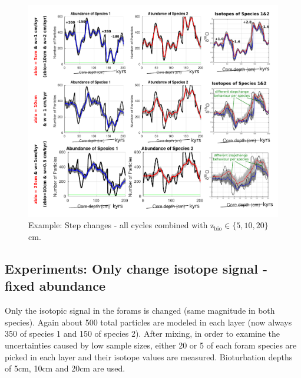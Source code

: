 \documentclass[a4paper,oneside,9pt]{article}
\begin{document}
\begin{figure}[hbp]
\begin{center}
	\includegraphics[width=1.0\textwidth]{../figures/../figures/Allcycles_combined_stepevent_bigger_5+10+20cm_background.pdf}
	\caption{Example: Step changes - all cycles combined with z$_\mathrm{bio} \in \{5,10,20 \}$cm.}\label{fig:5pointevent}
\end{center}
\end{figure}



\subsection{Experiments: Only change isotope signal - fixed abundance}
Only the isotopic signal in the forams is changed (same magnitude in both species). Again about 500 total particles are modeled in each layer (now always 350 of species 1 and 150 of species 2). 
After mixing, in order to examine the uncertainties caused by low sample sizes, either 20 or 5 of each foram species are picked in each layer and their isotope values are measured.
Bioturbation depths of 5cm, 10cm and 20cm are used. 
\end{document}
